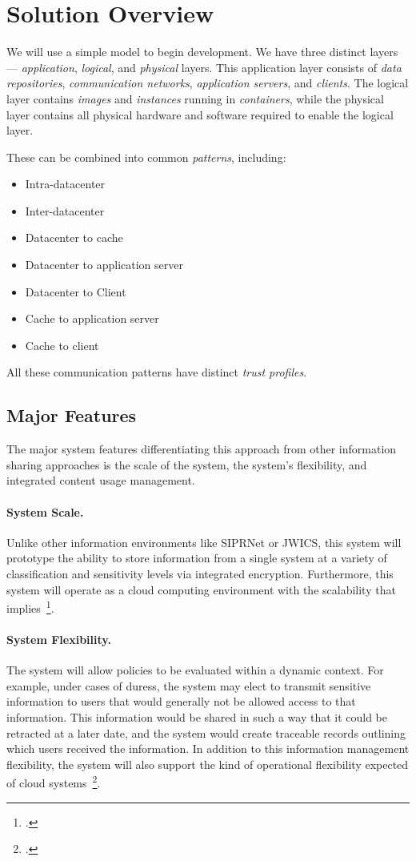\documentclass[10pt,letterpaper]{article}
\begin{document}
\section{Solution Overview}
\label{sec:overview}
We will use a simple model to begin development.  We have three distinct layers --- {\sl application}, {\sl logical}, and {\sl physical} layers. This application layer consists of {\sl data repositories}, {\sl communication networks}, {\sl application servers}, and {\sl clients}.  The logical layer contains {\sl images} and {\sl instances} running in {\sl containers}, while the physical layer contains all physical hardware and software required to enable the logical layer.

These can be combined into common {\sl patterns}, including:
\begin{itemize}
\item Intra-datacenter
\item Inter-datacenter
\item Datacenter to cache
\item Datacenter to application server
\item Datacenter to Client
\item Cache to application server
\item Cache to client
\end{itemize}
All these communication patterns have distinct {\sl trust profiles}.

\subsection{Major Features}
\label{sec:features}
The major system features differentiating this approach from other information sharing approaches is the scale of the system, the system's flexibility, and integrated content usage management.

\paragraph{System Scale.} Unlike other information environments like SIPRNet or JWICS, this system will prototype the ability to store information from a single system at a variety of classification and sensitivity levels via integrated encryption.  Furthermore, this system will operate as a cloud computing environment with the scalability that implies~\footcite{nist-sp-800-145}.

\paragraph{System Flexibility.} The system will allow policies to be evaluated within a dynamic context.  For example, under cases of duress, the system may elect to transmit sensitive information to users that would generally not be allowed access to that information.  This information would be shared in such a way that it could be retracted at a later date, and the system would create traceable records outlining which users received the information.  In addition to this information management flexibility, the system will also support the kind of operational flexibility expected of cloud systems~\footcite{nist-sp-800-145}.
\end{document}
